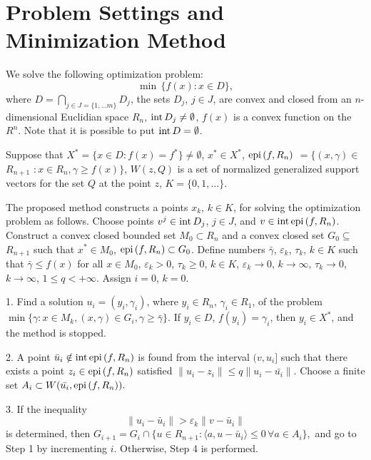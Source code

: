 \documentclass[12pt]{llncs}
\begin{document}
 
\section{Problem Settings and Minimization Method}
We solve the following optimization problem:
$$
\min\, \{ f(x) : x \in D\},
$$
where 
$D=\bigcap \limits_{j\in J=\{1, \dots m\}} D_j$,
the sets $D_j$, $j\in J$, are convex and closed from an $n$-dimensional Euclidian space $R_n$, 
${\rm int}\, D_j \ne \emptyset$, $f(x)$ is a convex function on the 
$R^n$.
Note that it is possible to put 
${\rm int}\, D =\emptyset$.

Suppose that $X^*=\{x\in D : f(x) = f^*\}\ne\emptyset$, $x^*\in X^*$, ${\rm epi}\, (f, R_n)$
$= \{ (x, \gamma) \in$ $R_{n+1}$ $: x \in R_n, \gamma \ge f(x) \}$, $W(z, Q)$ is a set of normalized generalized support vectors for the set $Q$ at the point $z$, 
$K=\{0, 1, \dots\}$.

The proposed method constructs a points $x_k$, $k\in K$, for solving the optimization problem as follows. 
Choose points $v^j \in {\rm int }\, D_j$, $j\in J$, and $v \in {\rm int\, epi} \, (f, R_n)$. Construct  a  convex closed bounded set $M_0 \subset R_n$ and a convex closed set $G_0 \subseteq$ $R_{n+1}$ such that $x^* \in M_0$, ${\rm epi} \, (f, R_n)\subset G_0$. 
Define numbers 
$\bar{\gamma}$, $\varepsilon_k$, $\tau_k$, $k\in K$ such that 
$\bar{\gamma}\le f(x)$ for all $x\in M_0$, $\varepsilon_k > 0$, $\tau_k \ge 0$, $k\in K$,
$\varepsilon_k \to 0$, $k\to \infty$, $\tau_k \to 0$, $k \to \infty$,
$1\le q < +\infty$. Assign $i=0$, $k=0$.

1. Find a solution $u_i = (y_i, \gamma_i)$, where $y_i \in R_n$, $\gamma_i \in R_1$, of the problem
$
\min \{ \gamma : x\in M_k, (x, \gamma)\in G_i, \gamma \ge \bar{\gamma}\}.
$
If $y_i\in D$, $f(y_i) = \gamma_i$, then $y_i\in X^*$, and the method is stopped.

2. A point $\bar{u}_i\notin {\rm int \, epi}\, (f, R_n)$ is found from the interval $(v, u_i]$ such that there exists a point $z_i \in {\rm epi\,} (f, R_n)$ satisfied
$\|u_i - z_i \| \le q \| u_i - \bar{u_i}\|$.
Choose a finite set $A_i \subset W(\bar{u_i}, {\rm epi\,}(f, R_n)).$

3. If the inequality
\begin{equation}\label{eqno4}
\|u_i - \bar{u}_i \| > \varepsilon_k \| v - \bar{u}_i\|
\end{equation}
is determined, then 
$G_{i+1} = G_i \cap \{u \in R_{n+1} : \langle a, u - \bar{u}_i\rangle \le 0 \,\forall a \in A_i \},$
and go to Step 1 by incrementing $i$. Otherwise, Step 4 is performed.
\end{document}
